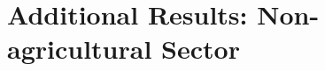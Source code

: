 \section{Additional Results: Non-agricultural Sector}\label{app:nonag}

\begin{landscape}
     
\end{landscape}


%      
% 
% 
% 
% 




